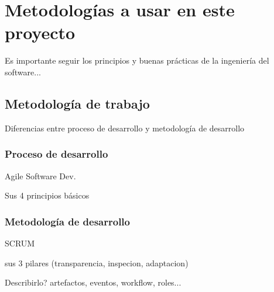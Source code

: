 \chapter{Metodologías a usar en este proyecto}
\label{chap:metodologias}

Es importante seguir los principios y buenas prácticas de la ingeniería del software...

\section{Metodología de trabajo}

Diferencias entre proceso de desarrollo y metodología de desarrollo

\subsection{Proceso de desarrollo}

Agile Software Dev.

Sus 4 principios básicos 

\subsection{Metodología de desarrollo}

SCRUM

sus 3 pilares (transparencia, inspecion, adaptacion)

Describirlo? artefactos, eventos, workflow, roles...